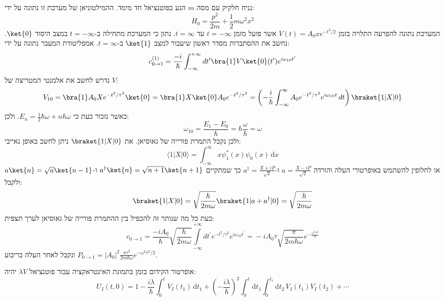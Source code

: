 \documentclass{tstextbook}
\begin{document}
\begin{example}
נניח חלקיק עם מסה \(m\) הנע בפוטנציאל חד מימד. ההמילטוניאן של מערכת זו נתונה על ידי:
$$H_{0}=\frac{p^{2}}{2m}+\frac{1}{2}m\omega^{2}x^{2}$$
המערכת נתונה להפרעה התלויה בזמן \(V(t)=A_{0}xe^{ -t^{2} / 2 }\) אשר פועל מזמן \(t=-\infty\) עד \(t=\infty\). נתון כי המערכת מתחילה ב-\(t=-\infty\) במצב היסוד \(\ket{0}\). נחשב את ההסתברות מסדר ראשון שיעבור למצב \(\ket{1}\) ב-\(t=\infty\). אמפליטודת המעבר נתונה על ידי:
$$c_{0\rightarrow1}^{(1)}=\frac{-i}{\hbar}\int_{-\infty}^{+\infty}d t^{\prime}\bra{1} V\ket{0} (t^{\prime})e^{i\omega_{10}t^{\prime}}$$
נדרש לחשב את אלמנטי המטריצה של \(V\):
$$V_{10}=\bra{1} A_{0}Xe^{ -t^{2}/\tau^{2} }\ket{0} =\bra{1} X\ket{0} A_{0}e^{ -t^{2}/\tau^{2} }=\left( -\frac{i}{\hbar}\int_{-\infty}^{\infty} A_{0}e^{ -t^{2}/\tau^{2} }e^{ i\omega_{10}t } \, dt \right)\braket{ 1|X | 0 }$$
כאשר נזכור כעת כי \(E_{n}=\frac{1}{2}\hbar \omega+n\hbar \omega\). ולכן:
$$\omega_{10}=\frac{E_{1}-E_{0}}{\hbar}=\hbar \frac{\omega}{\hbar}=\omega$$
ולכן נקבל התמרת פורייה של גאוסיאן. את \(\braket{ 1|X | 0 }\) ניתן לחשב באופן נאייבי:
$$\langle 1|X|0 \rangle =\int_{-\infty}^{\infty} x\psi_{1}^{*}(x)\psi_{0}(x) \, \mathrm{d}x $$
או לחלופין להשתמש באופרטורי העלה והורדה \(a=\frac{X-iP}{\sqrt{ 2 }}\) ו-\(a^{\dagger}=\frac{X+iP}{\sqrt{ 2 }}\) כך שמתקיים \(a^{\dagger}\ket{n}=\sqrt{ n+1 }\ket{n+1}\) ו-\(a\ket{n}=\sqrt{ a }\ket{n-1}\) ולקבל:
$$\braket{ 1 | X | 0 } =\sqrt{ \frac{\hbar}{2m\omega} }\braket{ 1 | a+a^{\dagger}|0 } =\sqrt{ \frac{\hbar}{2m\omega} }  $$
כעת כל מה שנותר זה להכפיל בין ההתמרת פורייה של גאוסיאן לערך תצפית:
$$\!\!\!\!\!c_{0\rightarrow1}\!=\!\frac{-iA_{0}}{\hbar}\!\sqrt{\frac{\hbar}{2m\omega}}\!\!\!\int\limits_{-\infty}^{+\infty}\!\!\!d t^{\prime}e^{-t^{2}/\tau^{2}}\!e^{i\omega_{10}t^{\prime}}\!\!=\!-i A_{0}\tau\!\sqrt{\frac{\pi}{2m\hbar\omega}}e^{-\frac{\omega^{2}\tau^{2}}{4}}$$
ונקבל לאחר העלה בריבוע \(P_{0\rightarrow1}=|A_{0}|^{2}\frac{\pi\tau^{2}}{2m\hbar\omega}e^{-\omega^{2}\tau^{2}/2}\).

\end{example}
\begin{reminder}
אופרטור הקידום בזמן בתמונת האינטראקציה עבור פוטנציאל \(\lambda V\) יהיה:
$$U_{I}(t,0)=1-\frac{i\lambda}{\hbar}\int_{0}^{t}V_{I}(t_{1})\,\mathrm{d} t_{1}+\left(-\frac{i\lambda}{\hbar}\right)^{2}\int_{0}^{t}\mathrm{d} t_{1}\int_{0}^{t_{1}}\mathrm{d} t_{2}\,V_{I}(t_{1})V_{I}(t_{2})+\cdots$$

\end{reminder}
\end{document}
